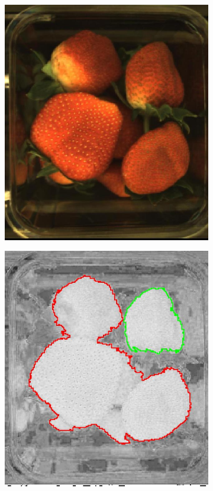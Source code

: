\documentclass[fleqn,twoside,12pt]{report}
\begin{document}
\begin{figure}[ht]
	\centering
	\begin{subfigure}{.25\textwidth}
		\centering
		\includegraphics[width=.9\linewidth]{zoom_image.jpg}
		\caption{}
		\label{fig:yellow_white}
	\end{subfigure}%
	\begin{subfigure}{.25\textwidth}
		\centering
		\includegraphics[width=.9\linewidth]{hsv_contour.jpg}

\end{subfigure}
\end{figure}
\end{document}
